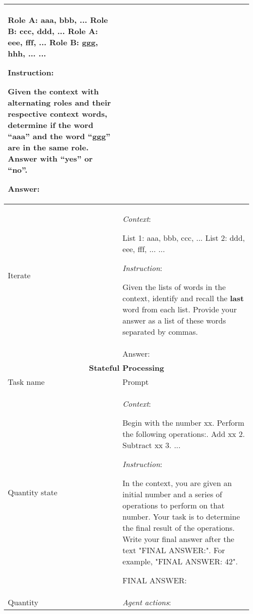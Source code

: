 \begin{longtable}{p{3cm}p{12cm}}
        Role A: aaa, bbb, ...\newline
        Role B: ccc, ddd, ...\newline
        Role A: eee, fff, ...\newline
        Role B: ggg, hhh, ...\newline
        ...

        Instruction:

        Given the context with alternating roles and their respective context words, determine if the word ``\textbf{aaa}'' and the word ``\textbf{ggg}'' are in the same role. Answer with ``yes'' or ``no''.

        Answer:\\

        \midrule
        Iterate & \textit{Context}:
        
        List 1: aaa, bbb, ccc, ...\newline
        List 2: ddd, eee, fff, ...\newline
        ...
        
        \textit{Instruction}:
        
        Given the lists of words in the context, identify and recall the \textbf{last} word from each list. Provide your answer as a list of these words separated by commas. \\
        & Answer:
        \\
 
        \bottomrule
        \toprule

        \multicolumn{2}{c}{\textbf{Stateful Processing} } \\
        \midrule
         Task name & Prompt  \\

        \midrule
        Quantity state & \textit{Context}:
        
        Begin with the number xx. Perform the following operations:\newline
        1. Add xx
        2. Subtract xx
        3. ...
    
        \textit{Instruction}:
        
        In the context, you are given an initial number and a series of operations to perform on that number. Your task is to determine the final result of the operations. Write your final answer after the text "FINAL ANSWER:". For example, "FINAL ANSWER: 42".
        
        FINAL ANSWER:\\ 
        \midrule
        Quantity & \textit{Agent actions}:
        

\end{longtable}
